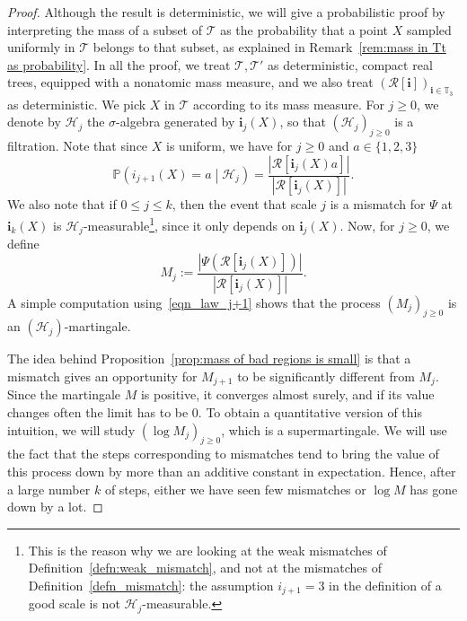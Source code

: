 \documentclass[JEP,XML,SOM,Unicode,NoFloatCountersInSection,published]{cedram}
\newcommand{\Ppsq}[2]{\mathbb{P} \left(#1\mathrel{}\middle|\mathrel{}#2\right)}
\newcommand{\Tt}{\mathcal{T}}
\newcommand{\Rr}{\mathcal{R}}
\newcommand{\ii}{\mathbf{i}}
\theoremstyle{plain}
\theoremstyle{definition}
\begin{document}
\begin{proof}
Although the result is deterministic, we will give a probabilistic proof
by interpreting the mass of a subset of $\Tt$ as the probability that a point $X$ sampled uniformly in $\Tt$ belongs to that subset, as explained in Remark~\ref{rem:mass in Tt as probability}.
In all the proof, we treat $\Tt, \Tt'$ as deterministic, compact real trees, equipped with a nonatomic mass measure, and we also treat $\left( \Rr[\ii] \right)_{\ii \in \mathbb{T}_3}$ as deterministic.
We pick $X$ in $\Tt$ according to its mass measure.
For $j \geq 0$, we denote by $\mathcal{H}_j$ the $\sigma$-algebra generated by $\ii_j(X)$, so that $(\mathcal H_j)_{j\geq 0}$ is a filtration.
Note that since $X$ is uniform, we have for $j \geq 0$ and $a \in \{1,2,3\}$\vspace*{-3pt}
\begin{equation}\label{eqn_law_j+1}
\Ppsq{i_{j+1}(X)=a}{\mathcal H_j} = \frac{\left| \Rr[\ii_j(X) a] \right|}{\left| \Rr[\ii_j(X)] \right|}.
\end{equation}
We also note that if $0 \leq j \leq k$, then the event that scale $j$ is a mismatch for $\Psi$ at $\ii_k(X)$ is $\mathcal{H}_j$-measurable\footnote{This is the reason why we are looking at the weak mismatches of Definition~\ref{defn:weak_mismatch}, and not at the mismatches of Definition~\ref{defn_mismatch}: the assumption $i_{j+1}=3$ in the definition of a good scale is not $\mathcal{H}_j$-measurable.}, since it only depends on $\ii_j(X)$.
Now, for $j \geq 0$, we define
\begin{equation}\label{eqn:martingale}
M_j:=\frac{\left| \Psi \left( \Rr[\ii_j(X)] \right) \right|}{\left| \Rr[\ii_j(X)] \right|}.
\end{equation}
A simple computation using~\eqref{eqn_law_j+1} shows that the process $(M_j)_{j \geq 0}$ is an $(\mathcal H_j)$\nobreakdash-mar\-tingale.

The idea behind Proposition~\ref{prop:mass of bad regions is small} is that a mismatch gives an opportunity for $M_{j+1}$ to be significantly different from $M_j$. Since the martingale $M$ is positive, it converges almost surely, and if its value changes often the limit has to be $0$.
To obtain a quantitative version of this intuition, we will study $(\log M_j)_{j \geq 0}$, which is a supermartingale. We will use the fact that the steps corresponding to mismatches tend to bring the value of this process down by more than an additive constant in expectation. Hence, after a large number $k$ of steps, either we have seen few mismatches or $\log M$ has gone down by a lot.


\end{proof}
\end{document}
